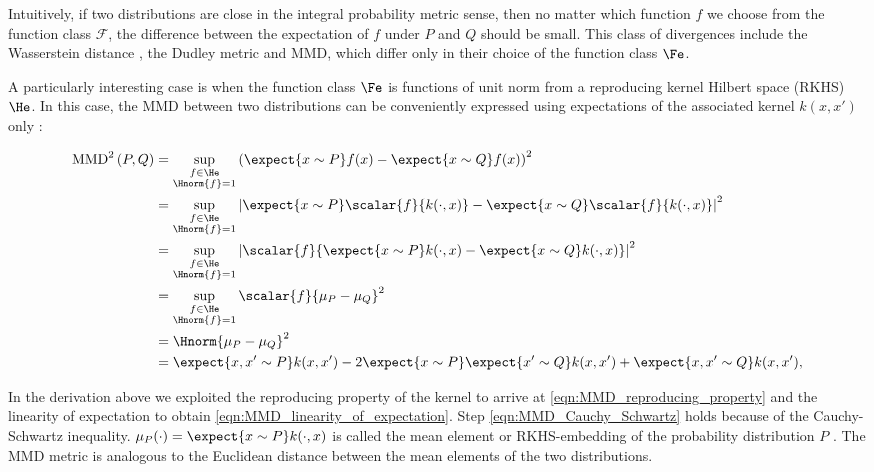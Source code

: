 Intuitively, if two distributions are close in the integral probability metric sense, then no matter which function $f$ we choose from the function class $\mathcal{F}$, the difference between the expectation of $f$ under $P$ and $Q$ should be small. This class of divergences include the Wasserstein distance \citep{Barrio1999}, the Dudley metric \citep{Dudley1974} and MMD, which differ only in their choice of the function class $\Fe$.

A particularly interesting case is when the function class $\Fe$ is functions of unit norm from a reproducing kernel Hilbert space (RKHS) $\He$. In this case, the MMD between two distributions can be conveniently expressed using expectations of the associated kernel $k(x, x')$ only \citep{Sriperumbudur2008}:

\begin{align}
\mbox{MMD}^2\left(P,Q\right) &= \sup_{\substack{f\in\He\\\Hnorm{f}=1}}\left( \expect{x\sim P} f(x) - \expect{x\sim Q} f(x) \right)^2\label{eqn:rkhs-mmd}\\
	&=  \sup_{\substack{f\in\He\\\Hnorm{f}=1}}\left\vert \expect{x\sim P}\scalar{f}{k(\cdot,x)} - \expect{x\sim Q} \scalar{f}{k(\cdot,x)} \right\vert^2\label{eqn:MMD_reproducing_property}\\
	&=  \sup_{\substack{f\in\He\\\Hnorm{f}=1}}\left\vert \scalar{f}{\expect{x\sim P} k(\cdot,x) - \expect{x\sim Q} k(\cdot,x)}\right\vert^2\label{eqn:MMD_linearity_of_expectation}\\
	&=  \sup_{\substack{f\in\He\\\Hnorm{f}=1}}\scalar{f}{\mu_{P} - \mu_{Q}}^2\\
	&=  \Hnorm{\mu_{P} - \mu_{Q}}^2\label{eqn:MMD_Cauchy_Schwartz}\\
	&=  \expect{x,x'\sim P} k(x,x')	- 2 \expect{x\sim P}\expect{x'\sim Q} k(x,x') + \expect{x,x'\sim Q} k(x,x'),\label{eqn:rkhs-mmd-lastline}
\end{align}

In the derivation above we exploited the reproducing property of the kernel to arrive at \eqref{eqn:MMD_reproducing_property} and the linearity of expectation to obtain \eqref{eqn:MMD_linearity_of_expectation}. Step \eqref{eqn:MMD_Cauchy_Schwartz} holds because of the Cauchy-Schwartz inequality. $\mu_P(\cdot) = \expect{x\sim P} k(\cdot,x)$ is called the mean element or RKHS-embedding of the probability distribution $P$ \citep{Smola2007}. The MMD metric is analogous to the Euclidean distance between the mean elements of the two distributions.

